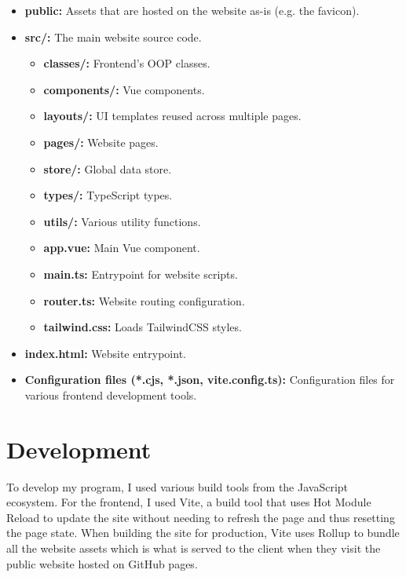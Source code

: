 \documentclass[notitlepage, 12pt]{report}
\begin{document}
\begin{minipage}{1\textwidth}
\begin{minipage}{0.29\textwidth}
	\end{minipage}
	\begin{minipage}{0.7\textwidth}
		\begin{itemize}[label={}, leftmargin=5pt]
			\item \textbf{public:} Assets that are hosted on the website as-is (e.g. the favicon).
			\item \textbf{src/:} The main website source code.
			      \begin{itemize}[label={}]
				      \item \textbf{classes/:} Frontend’s OOP classes.
				      \item \textbf{components/:} Vue components.
				      \item \textbf{layouts/:} UI templates reused across multiple pages.
				      \item \textbf{pages/:} Website pages.
				      \item \textbf{store/:} Global data store.
				      \item \textbf{types/:} TypeScript types.
				      \item \textbf{utils/:} Various utility functions.
				      \item \textbf{app.vue:} Main Vue component.
				      \item \textbf{main.ts:} Entrypoint for website scripts.
				      \item \textbf{router.ts:} Website routing configuration.
				      \item \textbf{tailwind.css:} Loads TailwindCSS styles.
			      \end{itemize}
			\item \textbf{index.html:} Website entrypoint.
			\item \textbf{Configuration files (*.cjs, *.json, vite.config.ts):} Configuration files for various frontend development tools.
		\end{itemize}
	\end{minipage}
\end{minipage}

\section*{Development}
To develop my program, I used various build tools from the JavaScript ecosystem. For the frontend, I used Vite, a build tool that uses Hot Module Reload to update the site without needing to refresh the page and thus resetting the page state. When building the site for production, Vite uses Rollup to bundle all the website assets which is what is served to the client when they visit the public website hosted on GitHub pages.
\end{document}
